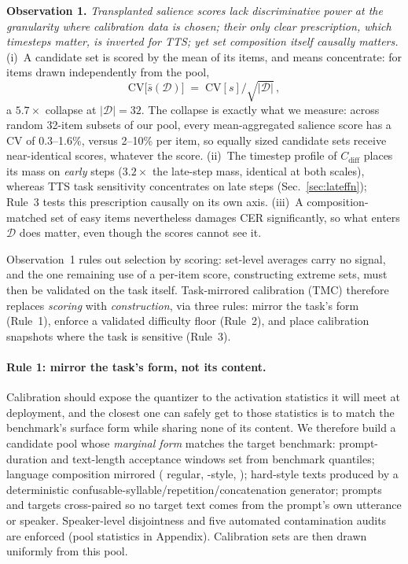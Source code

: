 \noindent\textbf{Observation 1.} \emph{Transplanted salience scores lack discriminative power at the granularity where calibration data is chosen; their only clear prescription, which timesteps matter, is inverted for TTS; yet set composition itself causally matters.} (i)~A candidate set is scored by the mean of its items, and means concentrate: for items drawn independently from the pool,
\begin{equation}
\mathrm{CV}\big[\bar{s}(\mathcal{D})\big] \;=\; \mathrm{CV}[s]\big/\sqrt{|\mathcal{D}|}\,,
\label{eq:cv}
\end{equation}
a $5.7\times$ collapse at $|\mathcal{D}|{=}32$. The collapse is exactly what we measure: across random 32-item subsets of our pool, every mean-aggregated salience score has a CV of 0.3--1.6\%, versus 2--10\% per item, so equally sized candidate sets receive near-identical scores, whatever the score. (ii)~The timestep profile of $C_\text{diff}$ places its mass on \emph{early} steps ($3.2\times$ the late-step mass, identical at both scales), whereas TTS task sensitivity concentrates on late steps (Sec.~\ref{sec:lateffn}); Rule~3 tests this prescription causally on its own axis. (iii)~A composition-matched set of easy items nevertheless damages \hard{} CER significantly, so what enters $\mathcal{D}$ does matter, even though the scores cannot see it.

Observation~1 rules out selection by scoring: set-level averages carry no signal, and the one remaining use of a per-item score, constructing extreme sets, must then be validated on the task itself. Task-mirrored calibration (TMC) therefore replaces \emph{scoring} with \emph{construction}, via three rules: mirror the task's form (Rule~1), enforce a validated difficulty floor (Rule~2), and place calibration snapshots where the task is sensitive (Rule~3).

\paragraph{Rule 1: mirror the task's form, not its content.}
Calibration should expose the quantizer to the activation statistics it will meet at deployment, and the closest one can safely get to those statistics is to match the benchmark's surface form while sharing none of its content. We therefore build a candidate pool whose \emph{marginal form} matches the target benchmark: prompt-duration and text-length acceptance windows set from benchmark quantiles; language composition mirrored (\zh{} regular, \hard{}-style, \en{}); hard-style texts produced by a deterministic confusable-syllable/repetition/concatenation generator; prompts and targets cross-paired so no target text comes from the prompt's own utterance or speaker. Speaker-level disjointness and five automated contamination audits are enforced (pool statistics in Appendix). Calibration sets are then drawn uniformly from this pool.

